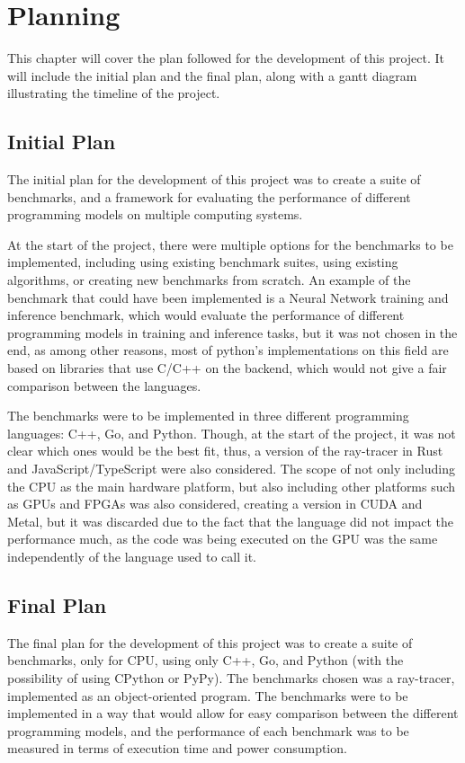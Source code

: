 \chapter{Planning}\label{chap:planning}

This chapter will cover the plan followed for the development of this project. It will include the initial plan and the final plan, along with a gantt diagram illustrating the timeline of the project.

\section{Initial Plan}
The initial plan for the development of this project was to create a suite of benchmarks, and a framework for evaluating the performance of different programming models on multiple computing systems. 

At the start of the project, there were multiple options for the benchmarks to be implemented, including using existing benchmark suites, using existing algorithms, or creating new benchmarks from scratch. An example of the benchmark that could have been implemented is a Neural Network training and inference benchmark, which would evaluate the performance of different programming models in training and inference tasks, but it was not chosen in the end, as among other reasons, most of python's implementations on this field are based on libraries that use C/C++ on the backend, which would not give a fair comparison between the languages.

The benchmarks were to be implemented in three different programming languages: C++, Go, and Python. Though, at the start of the project, it was not clear which ones would be the best fit, thus, a version of the ray-tracer in Rust and JavaScript/TypeScript were also considered. The scope of not only including the CPU as the main hardware platform, but also including other platforms such as GPUs and FPGAs was also considered, creating a version in \gls{CUDA} and \gls{Metal}, but it was discarded due to the fact that the language did not impact the performance much, as the code was being executed on the GPU was the same independently of the language used to call it.

\section{Final Plan}
The final plan for the development of this project was to create a suite of benchmarks, only for CPU, using only C++, Go, and Python (with the possibility of using CPython or PyPy). The benchmarks chosen was a ray-tracer, implemented as an object-oriented program. The benchmarks were to be implemented in a way that would allow for easy comparison between the different programming models, and the performance of each benchmark was to be measured in terms of execution time and power consumption.

